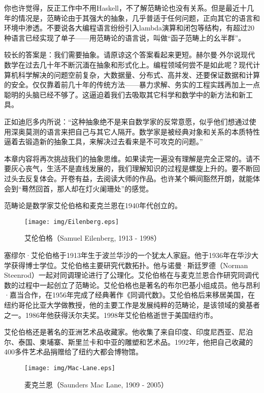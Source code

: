 \documentclass{article}
\begin{document}
你也许觉得，反正工作中不用Haskell，不了解范畴论也没有关系。但是最近十几年的情况是，范畴论由于其强大的抽象，几乎普适于任何问题，正向其它的语言和环境中渗透。不要说各大编程语言纷纷引入lambda演算和闭包等结构，有超过20种语言已经实现了单子\cite{Monad-Haskell-Wiki}——用范畴论的语言说，叫做“函子范畴上的幺半群”。

较长的答案是：我们需要抽象。请原谅这个答案看起来更短。赫尔曼$\cdot$外尔说现代数学在过去几十年不断沉湎在抽象和形式化上。编程领域何尝不是如此呢？现代计算机科学解决的问题空前复杂，大数据量、分布式、高并发、还要保证数据和计算的安全。仅仅靠着前几十年的传统方法——暴力求解、务实的工程实践再加上一点聪明的头脑已经不够了。这逼迫着我们去吸取其它科学和数学中的新方法和新工具。

正如迪厄多内所说：“这种抽象绝不是来自数学家的反常意愿，似乎他们想通过使用深奥莫测的语言来把自己与其它人隔开。数学家是被经典对象和关系的本质特性逼着去锻造新的抽象工具，来解决过去看来是不可攻克的问题。”\cite{Dieudonne1987}

本章内容将再次挑战我们的抽象思维。如果读完一遍没有理解是完全正常的。请不要灰心丧气，生活不是直线发展的，我们理解知识的过程是螺旋上升的。要不断回过头去反复体会。开卷有益，去阅读大师的作品。也许某个瞬间豁然开朗，就能体会到“蓦然回首，那人却在灯火阑珊处”的感觉。

范畴论是数学家艾伦伯格和麦克兰恩在1940年代创立的。

\begin{wrapfigure}{R}{0.3\textwidth}
 \centering
 \texttt{[image: img/Eilenberg.eps]}
 \captionsetup{labelformat=empty}
 \caption{艾伦伯格（Samuel Eilenberg, 1913 - 1998）}
 \label{fig:Eilenberg}
\end{wrapfigure}

塞缪尔·艾伦伯格于1913年生于波兰华沙的一个犹太人家庭。他于1936年在华沙大学获得博士学位。艾伦伯格主要研究代数拓扑。他与诺曼·斯廷罗德（Norman Steenrod）一起对同调理论进行了公理化。艾伦伯格在与麦克兰恩合作研究同调代数的过程中一起创立了范畴论。艾伦伯格也是著名的布尔巴基小组成员。他与昂利·嘉当合作，在1956年完成了经典著作《同调代数》。艾伦伯格后来移居美国，在纽约哥伦比亚大学做教授，他的主要工作是发展纯粹的范畴论，是该领域的奠基者之一。1986年他获得沃尔夫奖。1998年艾伦伯格逝世于美国纽约市。

艾伦伯格还是著名的亚洲艺术品收藏家。他收集了来自印度、印度尼西亚、尼泊尔、泰国、柬埔寨、斯里兰卡和中亚的雕塑和艺术品。1992年，他把自己收藏的400多件艺术品捐赠给了纽约大都会博物馆\cite{Wiki-Eilenberg}。

\begin{wrapfigure}{L}{0.3\textwidth}
 \centering
 \texttt{[image: img/Mac-Lane.eps]}
 \captionsetup{labelformat=empty}
 \caption{麦克兰恩（Saunders Mac Lane, 1909 - 2005）}
 \label{fig:Mac-Lane}
\end{wrapfigure}
\end{document}
